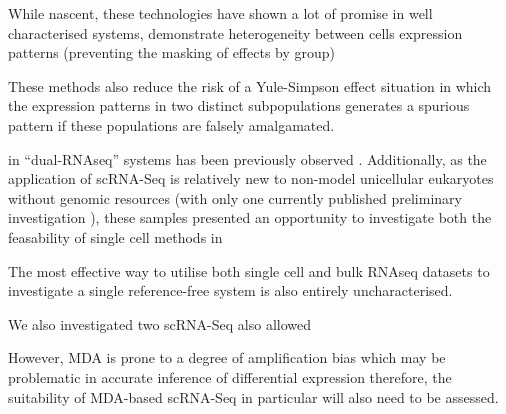 While nascent, these technologies have shown a lot of promise in well characterised systems, 
demonstrate heterogeneity between cells expression patterns (preventing the masking of effects by group)

These methods also reduce the risk of a Yule-Simpson effect \citep{Yule1903a,Simpson1951} situation in which the expression patterns
in two distinct subpopulations generates a spurious pattern if these populations are falsely amalgamated.



in ``dual-RNAseq'' systems has been previously observed \citep{Westermann2012}. Additionally, as the application of scRNA-Seq
is relatively new to non-model unicellular eukaryotes without genomic resources (with only one currently published preliminary investigation \citep{Kolisko2014}),
these samples presented an opportunity to investigate both the feasability of single cell methods in 



The most effective way to utilise both single cell and bulk RNAseq datasets to investigate a single reference-free system is also entirely
uncharacterised.


We also investigated two 
scRNA-Seq also allowed 



However, MDA is prone to a degree of amplification bias \citep{Liang2014} which may be problematic in accurate inference of differential expression
therefore, the suitability of MDA-based scRNA-Seq in particular will also need to be assessed.





